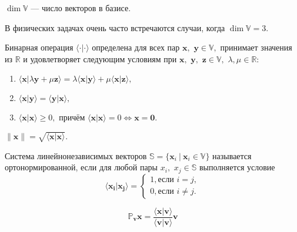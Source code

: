 \begin{definition}
$\dim \mathbb{V}$ --- число векторов в базисе.
\end{definition}
В физических задачах очень часто встречаются случаи, когда $\dim \mathbb{V} = 3.$
\begin{definition}
Бинарная операция $\langle \cdot \vert \cdot \rangle$ определена для всех
пар $\mathbf{x},$ $\mathbf{y} \in \mathbb{V},$ принимает значения из $\mathbb{R}$ и
удовлетворяет следующим условиям
при $\mathbf{x},$ $\mathbf{y},$ $\mathbf{z} \in \mathbb{V},$ $\lambda, \mu \in \mathbb{R}$:
\begin{enumerate}
\item $\langle \mathbf{x} \vert \lambda \mathbf{y} + \mu \mathbf{z} \rangle
 = \lambda \langle \mathbf{x} \vert \mathbf{y} \rangle
 + \mu \langle \mathbf{x} \vert \mathbf {z} \rangle,$
\item $\langle \mathbf{x} \vert \mathbf {y} \rangle
 = \langle \mathbf{y} \vert \mathbf {x} \rangle,$
\item $\langle \mathbf {x} \vert \mathbf {x} \rangle \ge 0,$
 причём $\langle \mathbf {x} \vert \mathbf {x} \rangle = 0
 \Leftrightarrow \mathbf {x} = \mathbf {0}.$
\end{enumerate}
\label{def:scalar_mul}
\end{definition}
\begin{definition}
$\lVert \mathbf{x}\rVert = \sqrt {\langle \mathbf {x} \vert \mathbf {x} \rangle}.$
\end{definition}
\begin{definition}
Система линейнонезависимых векторов $\mathbb{S}=\{\mathbf{x}_i~\vert~\mathbf{x}_i \in \mathbb{V}\}$
называется ортонормированной, если для любой пары $x_i,$ $x_j \in \mathbb{S}$
выполняется условие
$$\langle \mathbf {x_i} \vert \mathbf {x_j} \rangle = \left \{
\begin{matrix}
1,\text{если }i=j,\\
0,\text{если }i\ne j.\end{matrix}
\right.$$
\end{definition}
\begin{definition}
$$\mathbb{P}_\mathbf{v}\mathbf{x} = \frac {\langle\mathbf{x}\vert\mathbf{v}\rangle}
						{\langle\mathbf{v}\vert\mathbf{v}\rangle}\mathbf{v}$$
\end{definition}
